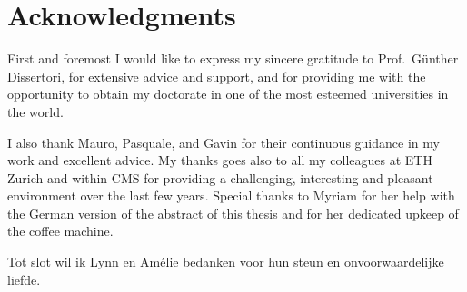 \section*{Acknowledgments}

First and foremost I would like to express my sincere gratitude to Prof.\ G{\"u}nther Dissertori, for extensive advice and support, and for providing me with the opportunity to obtain my doctorate in one of the most esteemed universities in the world.


I also thank Mauro, Pasquale, and Gavin for their continuous guidance in my work and excellent advice.
% 
My thanks goes also to all my colleagues at ETH Zurich and within CMS for providing a challenging, interesting and pleasant environment over the last few years.
% 
Special thanks to Myriam for her help with the German version of the abstract of this thesis and for her dedicated upkeep of the coffee machine.




Tot slot wil ik Lynn en Am{\'e}lie bedanken voor hun steun en onvoorwaardelijke liefde.

